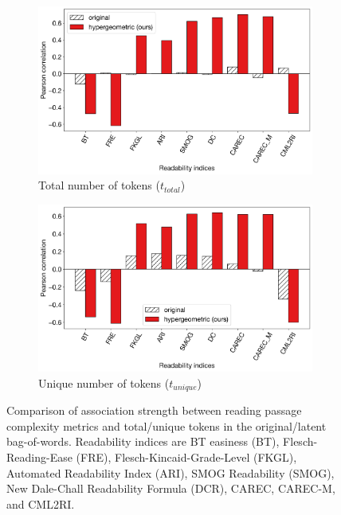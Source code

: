 \documentclass{article}
\theoremstyle{plain}
\theoremstyle{definition}
\theoremstyle{remark}
\begin{document}
\begin{figure}[t]
     \centering
     \begin{subfigure}{\columnwidth}
         \centering
         \includegraphics[width=0.9\columnwidth]{complexity_total_tokens.png}
         \caption{Total number of tokens ($t_{total}$)}
         \label{fig:complexity_total}
     \end{subfigure}
     \vfill
     \begin{subfigure}{\columnwidth}
         \centering
         \includegraphics[width=0.9\columnwidth]{complexity_unique_tokens.png}
         \caption{Unique number of tokens ($t_{unique}$)}
         \label{fig:complexity_unique}
     \end{subfigure}
     \caption{Comparison of association strength between reading passage complexity metrics and total/unique tokens in the original/latent bag-of-words. Readability indices are BT easiness (BT), Flesch-Reading-Ease (FRE), Flesch-Kincaid-Grade-Level (FKGL), Automated Readability Index (ARI), SMOG Readability (SMOG), New Dale-Chall Readability Formula (DCR), CAREC, CAREC-M, and CML2RI.}
     \label{fig:complexity_correlations}
\end{figure}
\end{document}

